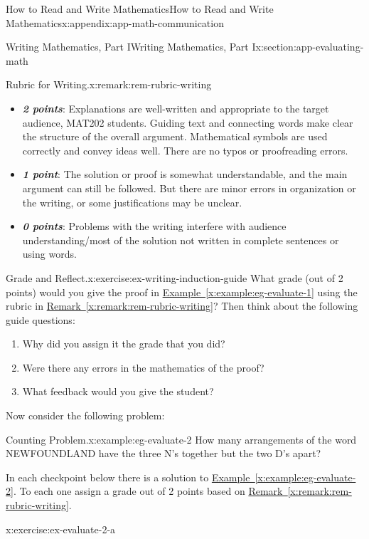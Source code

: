 \documentclass[oneside,10pt,]{book}
\newcommand{\xreffont}{\relax}
\newcommand{\alert}[1]{\textbf{\textit{#1}}}
\numberwithin{equation}{section}
\begin{document}
\begin{appendixptx}{How to Read and Write Mathematics}{}{How to Read and Write Mathematics}{}{}{x:appendix:app-math-communication}
\begin{sectionptx}{Writing Mathematics, Part I}{}{Writing Mathematics, Part I}{}{}{x:section:app-evaluating-math}
\begin{remark}{Rubric for Writing.}{x:remark:rem-rubric-writing}
%
\begin{itemize}[label=\textbullet]
\item{}\alert{2 points}: Explanations are well-written and appropriate to the target audience, MAT202 students. Guiding text and connecting words make clear the structure of the overall argument. Mathematical symbols are used correctly and convey ideas well. There are no typos or proofreading errors.%
\item{}\alert{1 point}: The solution or proof is somewhat understandable, and the main argument can still be followed. But there are minor errors in organization or the writing, or some justifications may be unclear.%
\item{}\alert{0 points}: Problems with the writing interfere with audience understanding\slash{}most of the solution not written in complete sentences or using words.%
\end{itemize}
%
\end{remark}
\begin{inlineexercise}{Grade and Reflect.}{x:exercise:ex-writing-induction-guide}%
What grade (out of 2 points) would you give the proof in \hyperref[x:example:eg-evaluate-1]{Example~{\xreffont\ref{x:example:eg-evaluate-1}}} using the rubric in \hyperref[x:remark:rem-rubric-writing]{Remark~{\xreffont\ref{x:remark:rem-rubric-writing}}}? Then think about the following guide questions:%
\begin{enumerate}[label=(\alph*)]
\item{}Why did you assign it the grade that you did?%
\item{}Were there any errors in the mathematics of the proof?%
\item{}What feedback would you give the student?%
\end{enumerate}
%
\end{inlineexercise}%
Now consider the following problem:%
\begin{example}{Counting Problem.}{x:example:eg-evaluate-2}%
How many arrangements of the word NEWFOUNDLAND have the three N's together but the two D's apart?%
\end{example}
In each checkpoint below there is a solution to \hyperref[x:example:eg-evaluate-2]{Example~{\xreffont\ref{x:example:eg-evaluate-2}}}. To each one assign a grade out of 2 points based on \hyperref[x:remark:rem-rubric-writing]{Remark~{\xreffont\ref{x:remark:rem-rubric-writing}}}.%
\begin{inlineexercise}{}{x:exercise:ex-evaluate-2-a}%
\begin{sidebyside}{1}{0}{0}{0}%

\end{sidebyside}
\end{inlineexercise}
\end{sectionptx}
\end{appendixptx}
\end{document}

